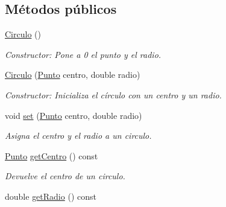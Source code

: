 \subsection*{Métodos públicos}
\begin{DoxyCompactItemize}
\item 
\hyperlink{classCirculo_a6933bf908b78a4167684081a3a8f257f}{Circulo} ()\hypertarget{classCirculo_a6933bf908b78a4167684081a3a8f257f}{}\label{classCirculo_a6933bf908b78a4167684081a3a8f257f}

\begin{DoxyCompactList}\small\item\em Constructor\+: Pone a 0 el punto y el radio. \end{DoxyCompactList}\item 
\hyperlink{classCirculo_ad4c6c76f0227c25afcb872a8744ebe56}{Circulo} (\hyperlink{classPunto}{Punto} centro, double radio)\hypertarget{classCirculo_ad4c6c76f0227c25afcb872a8744ebe56}{}\label{classCirculo_ad4c6c76f0227c25afcb872a8744ebe56}

\begin{DoxyCompactList}\small\item\em Constructor\+: Inicializa el círculo con un centro y un radio. \end{DoxyCompactList}\item 
void \hyperlink{classCirculo_aa24cc4b316a3d9ece35f120d9b8e1fc4}{set} (\hyperlink{classPunto}{Punto} centro, double radio)\hypertarget{classCirculo_aa24cc4b316a3d9ece35f120d9b8e1fc4}{}\label{classCirculo_aa24cc4b316a3d9ece35f120d9b8e1fc4}

\begin{DoxyCompactList}\small\item\em Asigna el centro y el radio a un circulo. \end{DoxyCompactList}\item 
\hyperlink{classPunto}{Punto} \hyperlink{classCirculo_a022cde4d10d14a47a3b3921f80909f3b}{get\+Centro} () const \hypertarget{classCirculo_a022cde4d10d14a47a3b3921f80909f3b}{}\label{classCirculo_a022cde4d10d14a47a3b3921f80909f3b}

\begin{DoxyCompactList}\small\item\em Devuelve el centro de un circulo. \end{DoxyCompactList}\item 
double \hyperlink{classCirculo_a982f8a785d8a68ab1483b609cd752980}{get\+Radio} () const \hypertarget{classCirculo_a982f8a785d8a68ab1483b609cd752980}{}\label{classCirculo_a982f8a785d8a68ab1483b609cd752980}


\end{DoxyCompactItemize}
